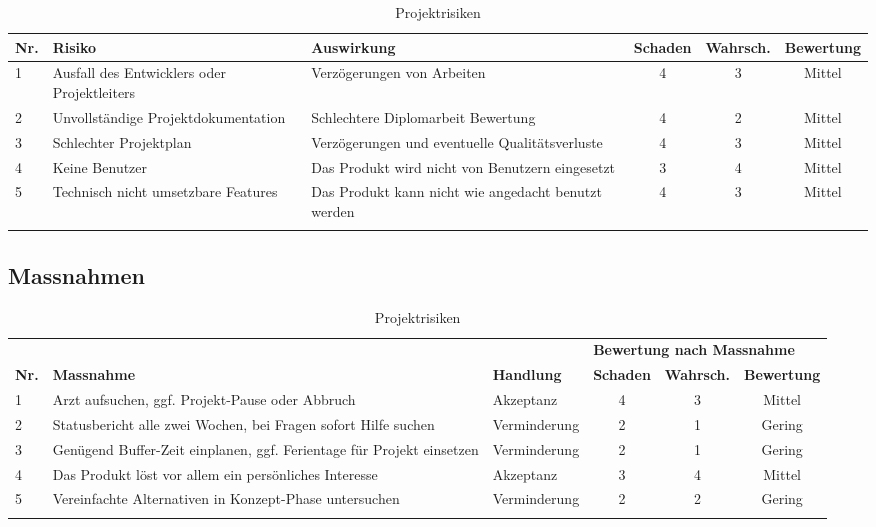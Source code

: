\begin{longtable}[]{@{}lp{3cm}p{4cm}ccc@{}}
  \toprule
  \textbf{Nr.} & \textbf{Risiko}                             & \textbf{Auswirkung}                                 & \textbf{Schaden} & \textbf{Wahrsch.} & \textbf{Bewertung}\tabularnewline
  \midrule
  \endhead
  1            & Ausfall des Entwicklers oder Projektleiters & Verzögerungen von Arbeiten                          & 4                & 3                 & Mittel\tabularnewline
  2            & Unvollständige Projektdokumentation         & Schlechtere Diplomarbeit Bewertung                  & 4                & 2                 & Mittel\tabularnewline
  3            & Schlechter Projektplan                      & Verzögerungen und eventuelle Qualitätsverluste      & 4                & 3                 & Mittel\tabularnewline
  4            & Keine Benutzer                              & Das Produkt wird nicht von Benutzern eingesetzt     & 3                & 4                 & Mittel\tabularnewline
  5            & Technisch nicht umsetzbare Features         & Das Produkt kann nicht wie angedacht benutzt werden & 4                & 3                 & Mittel\tabularnewline
  \bottomrule
  \caption{Projektrisiken}
\end{longtable}

\clearpage
\subsection{Massnahmen}\label{massnahmen}

\begin{longtable}[]{@{}lp{4.1cm}lccc@{}}
  \toprule
               &                                                                       &                   & \multicolumn{3}{l}{\textbf{Bewertung nach Massnahme}}\tabularnewline
  \textbf{Nr.} & \textbf{Massnahme}                                                    & \textbf{Handlung} & \textbf{Schaden}                                                     & \textbf{Wahrsch.} & \textbf{Bewertung}\tabularnewline
  \midrule
  \endhead
  1            & Arzt aufsuchen, ggf. Projekt-Pause oder Abbruch                       & Akzeptanz         & 4                                                                    & 3                 & Mittel\tabularnewline
  2            & Statusbericht alle zwei Wochen, bei Fragen sofort Hilfe suchen        & Verminderung      & 2                                                                    & 1                 & Gering\tabularnewline
  3            & Genügend Buffer-Zeit einplanen, ggf. Ferientage für Projekt einsetzen & Verminderung      & 2                                                                    & 1                 & Gering\tabularnewline
  4            & Das Produkt löst vor allem ein persönliches Interesse                 & Akzeptanz         & 3                                                                    & 4                 & Mittel\tabularnewline
  5            & Vereinfachte Alternativen in Konzept-Phase untersuchen                & Verminderung      & 2                                                                    & 2                 & Gering\tabularnewline
  \bottomrule
  \caption{Projektrisiken}
\end{longtable}

